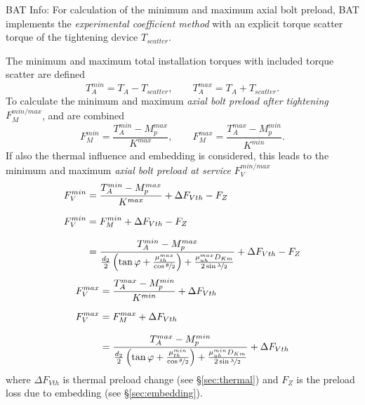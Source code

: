 \begin{colbox}{BAT Info:}
  For calculation of the minimum and maximum axial bolt preload, BAT implements the 
  \emph{experimental coefficient method} \cite{ECSS_HB_32_23A} with an explicit torque scatter torque
  of the tightening device $T_{scatter}$.
\end{colbox}
The minimum and maximum total installation torques with included torque scatter are defined 
\begin{equation}
  T_A^{min} = T_A - T_{scatter} , \qquad T_A^{max} = T_A + T_{scatter}.
  \label{equ:Tscatter}
\end{equation}
To calculate the minimum and maximum \emph{axial bolt preload after tightening} $F_M^{min/max}$, 
 and  are combined 
\begin{equation}
  F_M^{min} = \frac{T_A^{min}-M_p^{max}}{K^{max}} ,\qquad
  F_M^{max} = \frac{T_A^{max}-M_p^{min}}{K^{min}}.
\end{equation}
If also the thermal influence and embedding is considered, this leads to the minimum and maximum
\emph{axial bolt preload at service} $F_V^{min/max}$
\begin{subequations}
  \setlength{\jot}{10pt}
  \begin{align}
    F_V^{min} &= \frac{T_A^{min}-M_p^{max}}{K^{max}}+\Delta F_{Vth}-F_Z \\
    F_V^{min} &= F_M^{min}+\Delta F_{Vth}-F_Z \\
    &= \frac{T_A^{min}-M_p^{max}}{\frac{d_2}{2} \left( \tan\varphi + \frac{\mu_{th}^{max}}
    {\cos\nicefrac{\theta}{2}} \right) + \frac{\mu_{uh}^{max} D_{Km}}
    {2 \sin\nicefrac{\lambda}{2}}}+\Delta F_{Vth}-F_Z
    \label{equ:FVmin}
  \end{align}
\end{subequations}
\begin{subequations}
  \setlength{\jot}{10pt}
  \begin{align}
    F_V^{max} &= \frac{T_A^{max}-M_p^{min}}{K^{min}}+\Delta F_{Vth} \\
    F_V^{max} &= F_M^{max}+\Delta F_{Vth} \\
    &= \frac{T_A^{max}-M_p^{min}}{\frac{d_2}{2} \left( \tan\varphi + \frac{\mu_{th}^{min}}
    {\cos \nicefrac{\theta}{2}} \right) + \frac{\mu_{uh}^{min} D_{Km}}
    {2 \sin \nicefrac{\lambda}{2}}}+\Delta F_{Vth}
    \label{equ:FVmax}
  \end{align}
\end{subequations}
where $\Delta F_{Vth}$ is thermal preload change (see §\ref{sec:thermal}) and 
$F_Z$ is the preload loss due to embedding (see §\ref{sec:embedding}).

